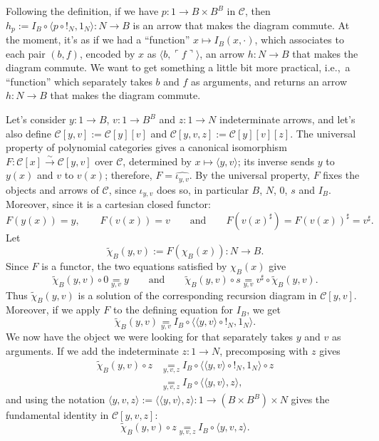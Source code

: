\begin{remark}
    Following the definition, if we have $p : 1 \to B \times B^B$ in $\mathcal{C}$, then $h_p := I_B \circ \langle p \circ !_N,1_N\rangle : N \to B$ is an arrow that makes the diagram commute.
    At the moment, it's as if we had a “function” $x \mapsto I_B(x,\cdot)$, which associates to each pair $(b,f)$, encoded by $x$ as $\langle b, \ulcorner f \urcorner \rangle$, an arrow $h : N \to B$ that makes the diagram commute.
    We want to get something a little bit more practical, i.e.,\ a “function” which separately takes $b$ and $f$ as arguments, and returns an arrow $h : N \to B$ that makes the diagram commute.
\end{remark}

Let's consider $y : 1 \to B$, $v : 1 \to B^B$ and $z : 1 \to N$ indeterminate arrows, and let's also define $\mathcal{C}[y,v] := \mathcal{C}[y][v]$ and $\mathcal{C}[y,v,z] := \mathcal{C}[y][v][z]$.\newline
The universal property of polynomial categories gives a canonical isomorphism $F : \mathcal{C}[x] \xrightarrow{\sim} \mathcal{C}[y,v]$ over $\mathcal{C}$, determined by $x \mapsto \langle y,v\rangle$;
its inverse sends $y$ to $y(x)$ and $v$ to $v(x)$; therefore, $F = \widehat{\iota_{y,v}}$.
By the universal property, $F$ fixes the objects and arrows of $\mathcal C$, since $\iota_{y,v}$ does so, in particular $B$, $N$, $0$, $s$ and $I_B$. Moreover, since it is a cartesian closed functor:
\[ F(y(x)) = y, \qquad F(v(x)) = v \qquad\text{and}\qquad F(v(x)^\sharp) = F(v(x))^\sharp = v^\sharp. \]
Let
\[ \widetilde{\chi}_B(y,v) := F(\chi_B(x)) : N \to B. \]
Since $F$ is a functor, the two equations satisfied by $\chi_B(x)$ give
\[ \widetilde{\chi}_B(y,v) \circ 0 \underset{y,v}{=} y \qquad\text{and}\qquad
\widetilde{\chi}_B(y,v) \circ s \underset{y,v}{=} v^\sharp \circ \widetilde{\chi}_B(y,v). \]
Thus $\widetilde{\chi}_B(y,v)$ is a solution of the corresponding recursion diagram in $\mathcal C[y,v]$. Moreover, if we apply $F$ to the defining equation for $I_B$, we get
\[ \widetilde{\chi}_B(y,v) \underset{y,v}{=} I_B \circ \langle \langle y,v\rangle \circ !_N,1_N\rangle.\]
We now have the object we were looking for that separately takes $y$ and $v$ as arguments. If we add the indeterminate $z : 1 \to N$, precomposing with $z$ gives
\begin{align*}
    \widetilde{\chi}_B(y,v) \circ z &\underset{y,v,z}{=} I_B \circ \langle \langle y,v\rangle \circ !_N,1_N\rangle \circ z \\
                                     &\underset{y,v,z}{=} I_B \circ \langle \langle y,v\rangle,z\rangle,
\end{align*}
and using the notation $\langle y,v,z\rangle := \langle \langle y,v\rangle, z\rangle : 1 \to (B \times B^B) \times N$ gives the fundamental identity in $\mathcal{C}[y,v,z]$:
\[ \widetilde{\chi}_B(y,v) \circ z \underset{y,v,z}{=} I_B \circ \langle y,v,z\rangle. \]

